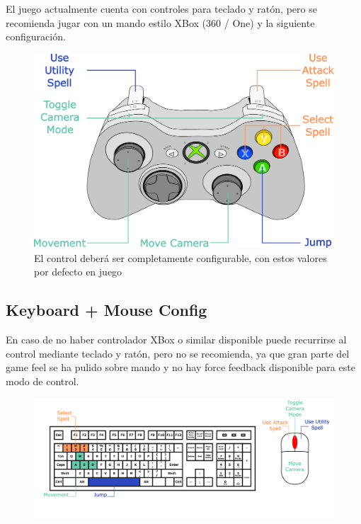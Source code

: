 \documentclass[12pt]{report}
\begin{document}
El juego actualmente cuenta con controles para teclado y ratón, pero se recomienda jugar con un mando estilo XBox (360 / One) y la siguiente configuración.

\begin{figure}[h]
    \centering
    \includegraphics[width=\textwidth]{controller}
    \caption{El control deberá ser completamente configurable, con estos valores por defecto en juego}
\end{figure}

\newpage

\subsection{Keyboard + Mouse Config}

En caso de no haber controlador XBox o similar disponible puede recurrirse al control mediante teclado y ratón, pero no se recomienda, ya que gran parte del game feel se ha pulido sobre mando y no hay force feedback disponible para este modo de control.

\begin{figure}[h]
    \centering
    \includegraphics[width=\textwidth]{keyboard}
\end{figure}     
\end{document}
